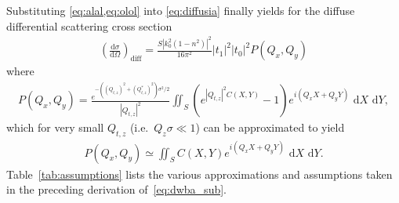 \documentclass[10pt,twoside, b5paper,pdftex]{report}
\begin{document}
 Substituting \cref{eq:alal,eq:olol} into \cref{eq:diffusia} finally yields  for the diffuse differential scattering cross section
\begin{align}
	\boxed{\left(\frac{\mbox{d}\sigma}{\mbox{d}\Omega}\right)_{\mbox{diff}} = \frac{S\left|k_{0}^{2}(1-n^{2})\right|^2}{16\pi^{2}} |t_{1}|^2|t_{0}|^2 P(Q_x,Q_y)} \label{eq:dwba_sub}
\end{align} 
where
\begin{align}
    P(Q_x,Q_y) = \frac{e^{-\left((Q_{t,z})^{2}+(Q^{*}_{t,z})^{2}\right) \sigma^{2}/2}}{|Q_{t,z}|^2}\iint_{S} \left(e^{|Q_{t,z}|^2 C(X, Y)} -1\right)e^{i\left(Q_{x}X+Q_{y}Y\right)} \mbox{~d}X \mbox{~d}Y , \label{eq:Pxy}
\end{align} 
which for very small $Q_{t,z}$ (i.e.~$Q_z\sigma \ll 1$) can be approximated to yield
\begin{align}
    P(Q_x,Q_y) \simeq \iint_{S} C(X, Y)e^{i\left(Q_{x}X+Q_{y}Y\right)} \mbox{~d}X \mbox{~d}Y. \label{eq:Pxy_ez}
\end{align}  
Table~\cref{tab:assumptions} lists the various approximations and assumptions taken in the preceding derivation of~\cref{eq:dwba_sub}.
\end{document}
